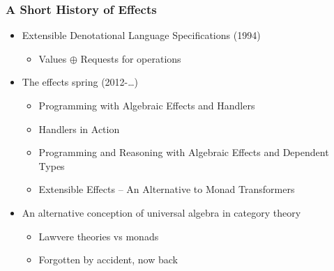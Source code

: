 \documentclass{beamer}
\begin{document}

\begin{frame}
  \frametitle{A Short History of Effects}

  \begin{itemize}
  \item Extensible Denotational Language Specifications (1994)
    \begin{itemize}
    \item Values $\oplus$ Requests for operations
    \end{itemize}
  \pause
  \vfill
  \item The effects spring (2012-\ldots)
    \begin{itemize}
    \item Programming with Algebraic Effects and Handlers
    \item Handlers in Action
    \item Programming and Reasoning with Algebraic Effects and Dependent Types
    \item Extensible Effects -- An Alternative to Monad Transformers
    \end{itemize}
  \pause
  \vfill
  \item An alternative conception of universal algebra in category theory
    \begin{itemize}
    \item Lawvere theories vs monads
    \item Forgotten by accident, now back
    \end{itemize}
  \end{itemize}
\end{frame}
\end{document}
